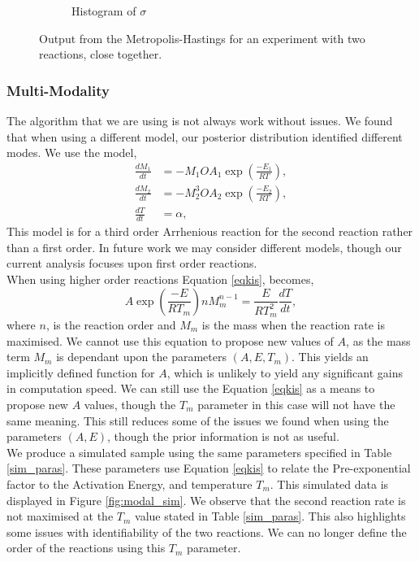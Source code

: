 \begin{figure}[h!]
\begin{subfigure}{0.5\textwidth}
\caption{Histogram of $\sigma$}
\label{Histsigma22}
\end{subfigure}%
\caption{Output from the Metropolis-Hastings for an experiment with two reactions, close together.}
\label{fig:MH4}
\end{figure}


\subsubsection{Multi-Modality}
The algorithm that we are using is not always work without issues. We found that when using a different model, our posterior distribution identified different modes. We use the model,
\begin{align*}
\frac{dM_1}{dt}&=-M_1OA_1\exp\left(\frac{-E_1}{RT}\right), \\
\frac{dM_2}{dt}&=-M_2^3OA_2\exp\left(\frac{-E_2}{RT}\right), \\ 
\frac{dT}{dt}&=\alpha, %
\end{align*}
This model is for a third order Arrhenious reaction for the second reaction rather than a first order. In future work we may consider different models, though our current analysis focuses upon first order reactions. \\
When using higher order reactions Equation \ref{eqkis}, becomes,
\begin{equation}
A\exp\left(\frac{-E}{RT_m}\right)nM_m^{n-1}=\frac{E}{RT_m^2}\frac{dT}{dt}, \label{eqkis2}
\end{equation}
where $n$, is the reaction order and $M_m$ is the mass when the reaction rate is maximised. We cannot use this equation to propose new values of $A$, as the mass term $M_m$ is dependant upon the parameters $(A,E,T_m)$. This yields an implicitly defined function for $A$, which is unlikely to yield any significant gains in computation speed. We can still use the Equation \ref{eqkis} as a means to propose new $A$ values, though the $T_m$ parameter in this case will not have the same meaning. This still reduces some of the issues we found when using the parameters $(A,E)$, though the prior information is not as useful.\\

We produce a simulated sample using the same parameters specified in Table \ref{sim_paras}. These parameters use Equation \ref{eqkis} to relate the Pre-exponential factor to the Activation Energy, and temperature $T_m$. This simulated data is displayed in Figure \ref{fig:modal_sim}. We observe that the second reaction rate is not maximised at the $T_m$ value stated in Table \ref{sim_paras}. This also highlights some issues with identifiability of the two reactions. We can no longer define the order of the reactions using this $T_m$ parameter.
 
